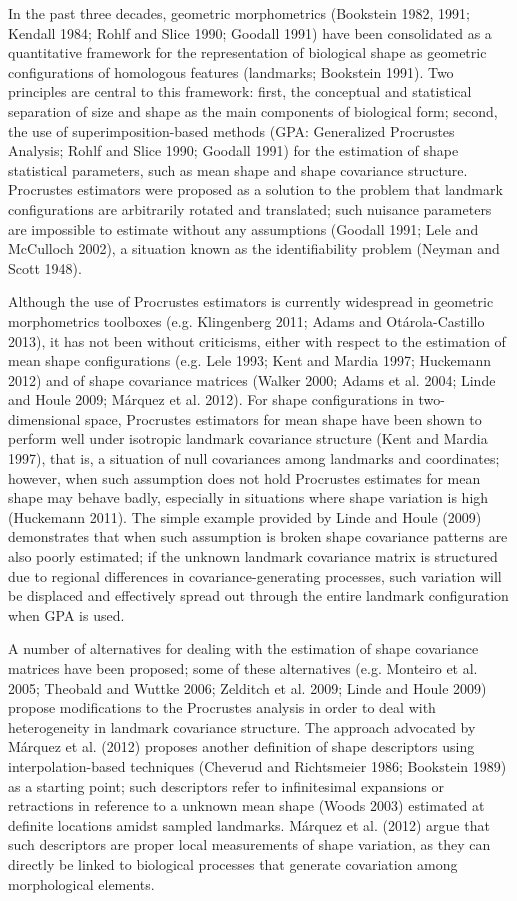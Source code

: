 \documentclass[12pt,]{article}
\begin{document}
In the past three decades, geometric morphometrics (Bookstein 1982,
1991; Kendall 1984; Rohlf and Slice 1990; Goodall 1991) have been
consolidated as a quantitative framework for the representation of
biological shape as geometric configurations of homologous features
(landmarks; Bookstein 1991). Two principles are central to this
framework: first, the conceptual and statistical separation of size and
shape as the main components of biological form; second, the use of
superimposition-based methods (GPA: Generalized Procrustes Analysis;
Rohlf and Slice 1990; Goodall 1991) for the estimation of shape
statistical parameters, such as mean shape and shape covariance
structure. Procrustes estimators were proposed as a solution to the
problem that landmark configurations are arbitrarily rotated and
translated; such nuisance parameters are impossible to estimate without
any assumptions (Goodall 1991; Lele and McCulloch 2002), a situation
known as the identifiability problem (Neyman and Scott 1948).

Although the use of Procrustes estimators is currently widespread in
geometric morphometrics toolboxes (e.g. Klingenberg 2011; Adams and
Otárola-Castillo 2013), it has not been without criticisms, either with
respect to the estimation of mean shape configurations (e.g. Lele 1993;
Kent and Mardia 1997; Huckemann 2012) and of shape covariance matrices
(Walker 2000; Adams et al. 2004; Linde and Houle 2009; Márquez et al.
2012). For shape configurations in two-dimensional space, Procrustes
estimators for mean shape have been shown to perform well under
isotropic landmark covariance structure (Kent and Mardia 1997), that is,
a situation of null covariances among landmarks and coordinates;
however, when such assumption does not hold Procrustes estimates for
mean shape may behave badly, especially in situations where shape
variation is high (Huckemann 2011). The simple example provided by Linde
and Houle (2009) demonstrates that when such assumption is broken shape
covariance patterns are also poorly estimated; if the unknown landmark
covariance matrix is structured due to regional differences in
covariance-generating processes, such variation will be displaced and
effectively spread out through the entire landmark configuration when
GPA is used.

A number of alternatives for dealing with the estimation of shape
covariance matrices have been proposed; some of these alternatives (e.g.
Monteiro et al. 2005; Theobald and Wuttke 2006; Zelditch et al. 2009;
Linde and Houle 2009) propose modifications to the Procrustes analysis
in order to deal with heterogeneity in landmark covariance structure.
The approach advocated by Márquez et al. (2012) proposes another
definition of shape descriptors using interpolation-based techniques
(Cheverud and Richtsmeier 1986; Bookstein 1989) as a starting point;
such descriptors refer to infinitesimal expansions or retractions in
reference to a unknown mean shape (Woods 2003) estimated at definite
locations amidst sampled landmarks. Márquez et al. (2012) argue that
such descriptors are proper local measurements of shape variation, as
they can directly be linked to biological processes that generate
covariation among morphological elements.
\end{document}

